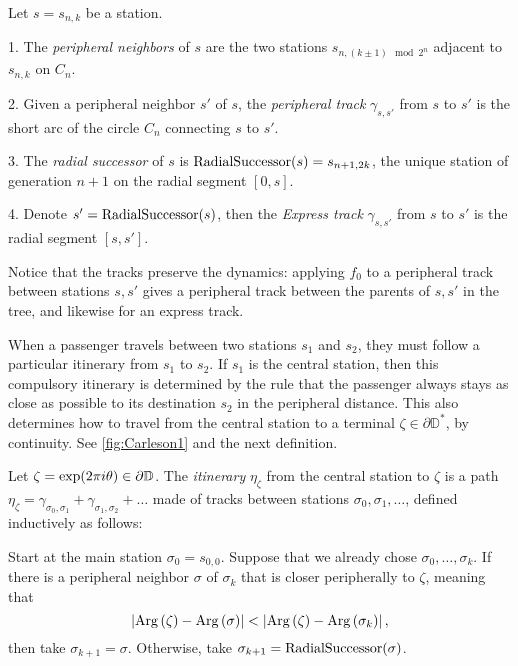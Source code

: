 \begin{definition}
Let $s=s_{n,k}$ be a station.

1. The \emph{peripheral neighbors} of $s$ are the two stations $s_{n,\left(k\pm1\right)\mod 2^{n}}$ adjacent to $s_{n,k}$ on $C_{n}$.

2. Given a peripheral neighbor $s'$ of $s$, the \emph{peripheral
	track }$\gamma_{s,s'}$ from $s$ to $s'$
is the short arc of the circle $C_{n}$ connecting $s$ to $s'$.

3. The \emph{radial successor} of $s$ is $\operatorname{RadialSuccessor}(s)=s_{n+1,2k}$, the unique station of generation $n+1$ on the radial segment $[0,s]$.

4. Denote $s'=\operatorname{RadialSuccessor}(s)$, then the \emph{Express track} $\gamma_{s,s'}$ from $s$ to $s'$ is the radial segment $[s,s']$.

\end{definition}

Notice that the tracks preserve the dynamics: applying $f_0$ to a peripheral track between stations $s,s'$ gives a peripheral track between the parents of $s,s'$ in the tree, and likewise for an express track.

When a passenger travels between two stations $s_1$ and $s_2$, they must follow a particular itinerary from $s_1$ to $s_2$.
If $s_1$ is the central station, then this compulsory itinerary is determined by the rule that the passenger always stays as close as possible to its destination $s_2$ in the peripheral distance. 
This also determines how to travel from the central station to a terminal $\zeta\in \partial \mathbb D^*$, by continuity. See \cref{fig:Carleson1} and the next definition.


\begin{definition}
Let $\zeta=\exp(2\pi i\theta)\in\partial\mathbb{D}$. The \emph{itinerary} $\eta_\zeta$ from the central station to $\zeta$ is a path 
$\eta_\zeta = \gamma _{\sigma_0,\sigma_1} + \gamma_{\sigma_1,\sigma_2}+\ldots$ made of tracks between stations $\sigma_0,\sigma_1,\ldots$, defined inductively as follows:

Start at the main station $\sigma_0=s_{0,0}$. Suppose that we already chose $\sigma_0,\ldots,\sigma_k$. If there is a peripheral neighbor $\sigma$ of $\sigma_k$ that is closer peripherally to $\zeta$, meaning that $$\left|\operatorname{Arg}\left(\zeta\right)-\operatorname{Arg}\left(\sigma\right)\right|
< \left|\operatorname{Arg}\left(\zeta\right)-\operatorname{Arg}\left(\sigma_{k}\right)\right|,$$ then take $\sigma_{k+1}=\sigma$. Otherwise, take 
$\sigma_{k+1}=\operatorname{RadialSuccessor}(\sigma)$.
\end{definition}

